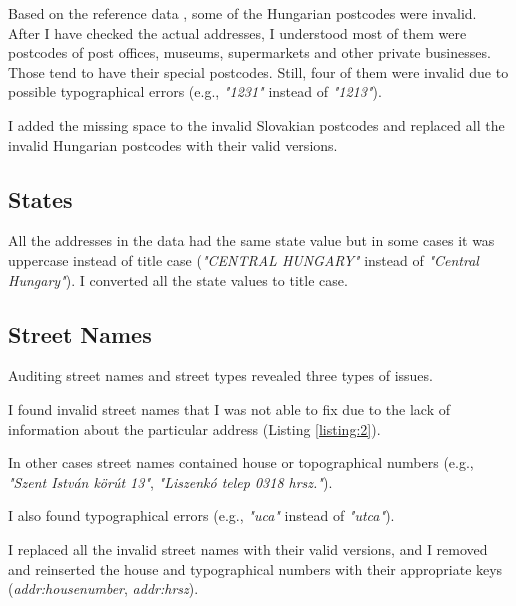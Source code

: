 \documentclass{article}
\begin{document}
\begin{multicols}{2}
Based on the reference data \cite{HungarianPostcodes:2015}, some of the Hungarian postcodes were invalid. After I have checked the actual addresses, I understood most of them were postcodes of post offices, museums, supermarkets and other private businesses. Those tend to have their special postcodes. Still, four of them were invalid due to possible typographical errors (e.g., \textit{"1231"} instead of \textit{"1213"}).

I added the missing space to the invalid Slovakian postcodes and replaced all the invalid Hungarian postcodes with their valid versions.


\subsection{States}

All the addresses in the data had the same state value but in some cases it was uppercase instead of title case (\textit{"CENTRAL HUNGARY"} instead of \textit{"Central Hungary"}). I converted all the state values to title case.


\subsection{Street Names}

Auditing street names and street types revealed three types of issues.

I found invalid street names that I was not able to fix due to the lack of information about the particular address (Listing \ref{listing:2}).

In other cases street names contained house or topographical numbers (e.g., \textit{"Szent István körút 13"}, \textit{"Liszenkó telep 0318 hrsz."}).

I also found typographical errors (e.g., \textit{"uca"} instead of \textit{"utca"}).

I replaced all the invalid street names with their valid versions, and I removed and reinserted the house and typographical numbers with their appropriate keys (\textit{addr:housenumber}, \textit{addr:hrsz}).


\end{multicols}
\end{document}

